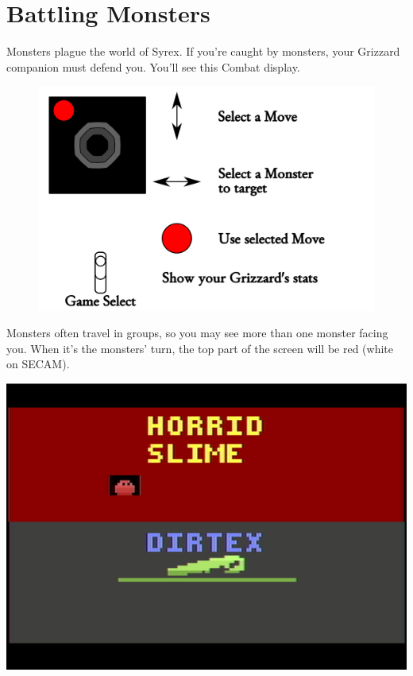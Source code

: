 \documentclass[10pt,twocolumn,openany,article]{memoir}
\begin{document}
\ifdefined\ATARIAGESAVE
\pagebreak
\fi

\section{Battling Monsters}

Monsters plague the  world of Syrex. If you're caught  by monsters, your
Grizzard  companion must  defend  you. You'll  see  this Combat  display.

\begin{figure}[t]
  \includegraphics[width=2\columnwidth]{../Manual/CombatControls.png}
\end{figure}

Monsters often  travel in groups, so  you may see more  than one monster
facing you.  When it's the  monsters' turn, the  top part of  the screen
will be red (white on SECAM).

\begin{center}
  \includegraphics[width=\columnwidth]{../Manual/MonsterCombatNTSC.png}
\end{center}
\end{document}
